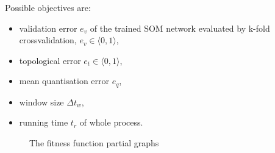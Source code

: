 \documentclass[a4paper]{IEEEtran}
\begin{document}
Possible objectives are:
\begin{itemize}
	\item validation error $ e_v $ of the trained SOM network evaluated by k-fold
	crossvalidation, $ e_v \in \langle 0, 1 \rangle $,
	\item topological error $ e_t \in \langle 0, 1 \rangle $,
	\item mean quantisation error $ e_q $,
	\item window size $ \Delta t_w $,
	\item running time $ t_r $ of whole process.
\end{itemize}
\begin{figure}[!h] %
  \centering
  \caption{The fitness function partial graphs}
  \label{fig:fit}
\end{figure}
\end{document}
